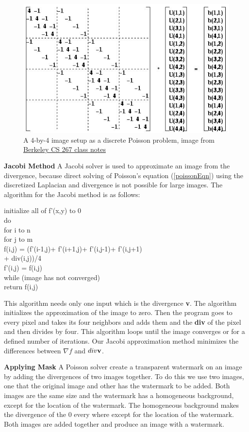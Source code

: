 \documentclass[10pt,twopage]{acmsiggraph}
\begin{document}
\begin{figure}%
\centering
\includegraphics[width=.44\textwidth]{fig/matrix.jpg}
\caption{A 4-by-4 image setup as a discrete Poisson problem, image from \href{http://www.cs.berkeley.edu/~demmel/cs267/lecture24/lecture24.html}{Berkeley CS 267 class notes} }
\label{poissonGrid}
\end{figure}


{\bf Jacobi Method}
A Jacobi solver is used to approximate an image from the divergence, because direct solving of Poisson's equation (\ref{poissonEqn}) using the discretized Laplacian and divergence is not possible for large images. The algorithm for the Jacobi method is as follows:

\begin{tabbing}
initialize all of f'(x,y) to 0\\
do \= \\
\> for i to n \= \\
\>\> for j to m\=\\
\>  \> f(i,j) = (f'(i-1,j)+ f'(i+1,j)+ f'(i,j-1)+ f'(i,j+1)\\
\> \>      \>       + div(i,j))/4 \\
f'(i,j) = f(i,j)\\
while (image has not converged) \\
return f(i,j)
\end{tabbing}

This algorithm needs only one input which is the divergence {\bf v}. The algorithm initializes the approximation of the image to zero. Then the program goes to every pixel and takes its four neighbors and adds them and the {\bf div} of the pixel and then divides by four. This algorithm loops until the image converges or for a defined number of iterations. Our Jacobi approximation method minimizes the differences between $\nabla f$ and $div{\bf v}$.

{\bf Applying Mask} A Poisson solver create a transparent watermark on an image by adding the divergences of two images together. To do this we use two images, one that the original image and other has the watermark to be added. Both images are the same size and the watermark has a homogeneous background, except for the location of the watermark. The homogeneous background makes the divergence of the 0 every where except for the location of the watermark. Both images are added together and produce an image with a watermark.
\end{document}

